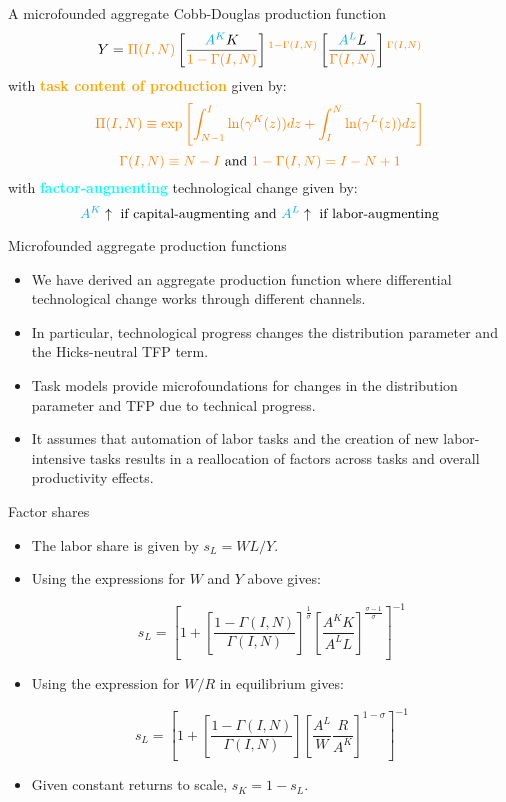\documentclass[notes=show]{beamer}
\begin{document}
\begin{frame}{A microfounded aggregate Cobb-Douglas production function}
\[
Y = \color{orange} \Pi(I,N) \color{black} \left[ \frac{\color{cyan}A^{K} \color{black}K}{\color{orange}1-\Gamma(I,N)} \color{black}\right]^{\color{orange} 1-\Gamma(I,N)} \color{black} \left[ \frac{\color{cyan}A^{L} \color{black}L}{\color{orange}\Gamma(I,N)} \color{black} \right]^{\color{orange} \Gamma(I,N)} 
\]
with \textcolor{orange}{\textbf{task content of production}} given by:
\[
\color{orange} \Pi(I,N) \equiv \exp \left[ \int_{N-1}^{I} \ln(\gamma^{K}(z))dz + \int_{I}^{N} \ln(\gamma^{L}(z))dz \right] 
\]
\[
\color{orange} \Gamma(I,N) \equiv N-I \color{black} \text{ and } \color{orange} 1 - \Gamma(I,N)=I - N + 1 \color{black} 
\]
with \textcolor{cyan}{\textbf{factor-augmenting}} technological change given by:
\[
\color{cyan} A^{K} \color{black} \uparrow \text{ if capital-augmenting and } \color{cyan} A^{L} \color{black} \uparrow \text{ if labor-augmenting}
\]
\end{frame}

\begin{frame}{Microfounded aggregate production functions}
\begin{itemize}
\item We have derived an aggregate production function where differential technological change works through different channels.
\item In particular, technological progress changes the distribution parameter and the Hicks-neutral TFP term. \medskip
\item Task models provide microfoundations for changes in the distribution parameter and TFP due to technical progress. \medskip
\item It assumes that automation of labor tasks and the creation of new labor-intensive tasks results in a reallocation of factors across tasks and overall productivity effects. 
\end{itemize}
\end{frame}

\begin{frame}{Factor shares}
\begin{itemize}
\item The labor share is given by $s_{L}=WL/Y$. \medskip
\item Using the expressions for $W$ and $Y$ above gives:
\begin{tcolorbox}
\[
s_{L} = \left[ 1+ [\frac{1-\Gamma(I,N)}{\Gamma(I,N)}]^{\frac{1}{\sigma}} [\frac{A^{K}K}{A^{L}L}]^{\frac{\sigma-1}{\sigma}} \right]^{-1} \tag{A5} \label{eqA5}
\]
\end{tcolorbox}
\item Using the expression for $W/R$ in equilibrium gives:
\begin{tcolorbox}
\[
s_{L} = \left[ 1+ [\frac{1-\Gamma(I,N)}{\Gamma(I,N)}] [\frac{A^{L}}{W} \frac{R}{A^{K}}]^{1-\sigma} \right]^{-1} \tag{A4} \label{eqA4}
\]
\end{tcolorbox}
\item Given constant returns to scale, $s_{K}=1-s_{L}$.
\end{itemize}
\end{frame}
\end{document}
